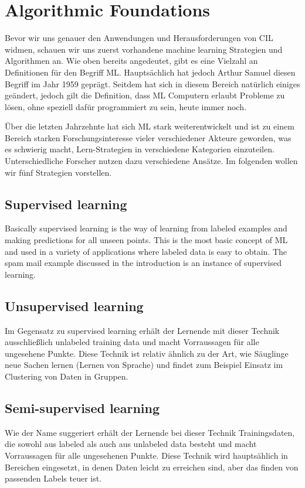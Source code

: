 \documentclass[conference,compsoc]{IEEEtran}
\begin{document}
\section{Algorithmic Foundations}
Bevor wir uns genauer den Anwendungen und Herausforderungen von CIL widmen, schauen wir uns 
zuerst vorhandene machine learning Strategien und Algorithmen an. Wie oben bereits angedeutet, 
gibt es eine Vielzahl an Definitionen für den Begriff ML\@. Hauptsächlich hat jedoch Arthur Samuel 
diesen Begriff im Jahr 1959 geprägt. Seitdem hat sich in diesem Bereich natürlich einiges geändert, 
jedoch gilt die Definition, dass ML Computern erlaubt Probleme zu lösen, ohne speziell dafür 
programmiert zu sein, heute immer noch\cite{MLStudiesUsingCheckers:samuel}.

Über die letzten Jahrzehnte hat sich ML stark weiterentwickelt und ist zu einem Bereich 
starken Forschungsinteresse vieler verschiedener Akteure geworden, was es schwierig macht, 
Lern-Strategien in verschiedene Kategorien einzuteilen. Unterschiedliche Forscher nutzen 
dazu verschiedene Ansätze\cite{FoundationsOfML:mohri}\cite{Structure:corne}. Im folgenden 
wollen wir fünf Strategien vorstellen\cite{FoundationsOfML:mohri}.

\subsection{Supervised learning}
Basically supervised learning is the way of learning from labeled examples and making predictions 
for all unseen points. This is the most basic concept of ML and used in a variety of applications 
where labeled data is easy to obtain. The spam mail example discussed in the introduction is an 
instance of supervised learning.

\subsection{Unsupervised learning}
Im Gegensatz zu supervised learning erhält der Lernende mit dieser Technik ausschließlich 
unlabeled training data und macht Vorraussagen für alle ungesehene Punkte. Diese Technik ist 
relativ ähnlich zu der Art, wie Säuglinge neue Sachen lernen (Lernen von Sprache) und 
findet zum Beispiel Einsatz im Clustering von Daten in Gruppen\cite{BrainInf:holzinger}.

\subsection{Semi-supervised learning}
Wie der Name suggeriert erhält der Lernende bei dieser Technik Trainingsdaten, die sowohl aus 
labeled als auch aus unlabeled data besteht und macht Vorraussagen für alle ungesehenen Punkte.
Diese Technik wird hauptsählich in Bereichen eingesetzt, in denen Daten leicht zu erreichen sind, 
aber das finden von passenden Labels teuer ist.
\end{document}
